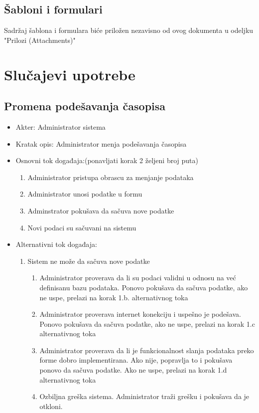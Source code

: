 \documentclass[a4paper]{article}
\begin{document}
\subsection{Šabloni i formulari}
Sadržaj šablona i formulara biće priložen nezavisno od ovog dokumenta u odeljku "Prilozi (Attachments)"

\section{Slučajevi upotrebe}

\subsection{Promena podešavanja časopisa}
\begin{itemize}
    \item Akter: Administrator sistema
    \item Kratak opis: Administrator menja podešavanja časopisa
    \item Osnovni tok događaja:(ponavljati korak 2 željeni broj puta)
        \begin{enumerate}
            \item Administrator pristupa obrascu za menjanje podataka
            \item Administrator unosi podatke u formu
            \item Adminstrator pokušava da sačuva nove podatke
            \item Novi podaci su sačuvani na sistemu
        \end{enumerate}
    \item Alternativni tok događaja:
        \begin{enumerate}
            \item Sistem ne može da sačuva nove podatke
                \begin{enumerate}
                    \item Administrator proverava da li su podaci validni u odnosu na već definisanu bazu podataka. Ponovo pokušava da sačuva podatke, ako ne uspe, prelazi na korak 1.b. alternativnog toka 
                    \item Administrator proverava internet konekciju i uspešno je podešava. Ponovo pokušava da sačuva podatke, ako ne uspe, prelazi na korak 1.c alternativnog toka
                    \item Administrator proverava da li je funkcionalnost slanja podataka preko forme dobro implementirana. Ako nije, popravlja to i pokušava ponovo da sačuva podatke. Ako ne uspe, prelazi na korak 1.d alternativnog toka
                    \item Ozbiljna greška sistema. Administrator traži grešku i pokušava da je otkloni.
                \end{enumerate}
        \end{enumerate}
\end{itemize}
\end{document}
